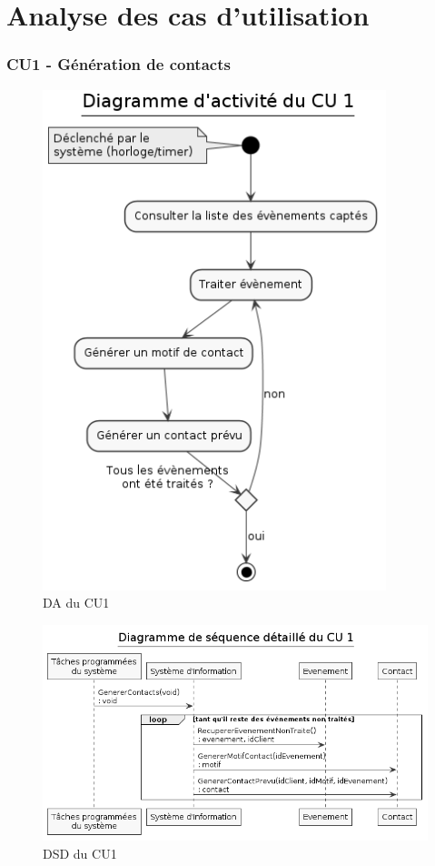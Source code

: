 \part{Analyse des cas d'utilisation}
\setcounter{section}{0}

\section{CU1 - Génération de contacts}

\begin{figure}[h]
\centering
\includegraphics[width=10cm]{figures/DA_CU1.png}
\caption{DA du CU1}
\end{figure}

\begin{figure}[h]
\centering
\includegraphics[width=\textwidth]{figures/DSD_CU1.png}
\caption{DSD du CU1}
\end{figure}

